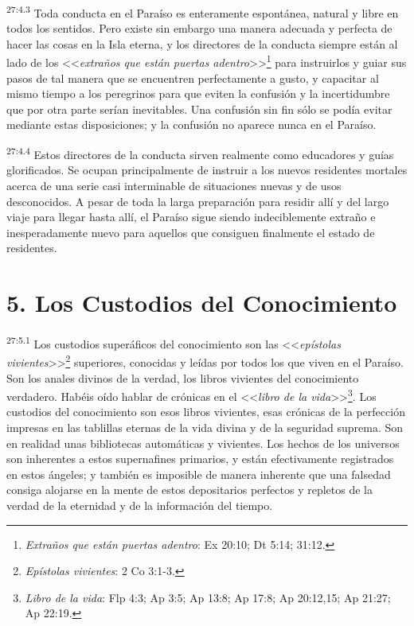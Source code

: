 \par
\textsuperscript{27:4.3} Toda conducta en el Paraíso es enteramente espontánea, natural y libre en todos los sentidos. Pero existe sin embargo una manera adecuada y perfecta de hacer las cosas en la Isla eterna, y los directores de la conducta siempre están al lado de los <<\textit{extraños que están puertas adentro}>>\footnote{\textit{Extraños que están puertas adentro}: Ex 20:10; Dt 5:14; 31:12.} para instruirlos y guiar sus pasos de tal manera que se encuentren perfectamente a gusto, y capacitar al mismo tiempo a los peregrinos para que eviten la confusión y la incertidumbre que por otra parte serían inevitables. Una confusión sin fin sólo se podía evitar mediante estas disposiciones; y la confusión no aparece nunca en el Paraíso.

\par
\textsuperscript{27:4.4} Estos directores de la conducta sirven realmente como educadores y guías glorificados. Se ocupan principalmente de instruir a los nuevos residentes mortales acerca de una serie casi interminable de situaciones nuevas y de usos desconocidos. A pesar de toda la larga preparación para residir allí y del largo viaje para llegar hasta allí, el Paraíso sigue siendo indeciblemente extraño e inesperadamente nuevo para aquellos que consiguen finalmente el estado de residentes.

\section*{5. Los Custodios del Conocimiento}
\par
\textsuperscript{27:5.1} Los custodios superáficos del conocimiento son las <<\textit{epístolas vivientes}>>\footnote{\textit{Epístolas vivientes}: 2 Co 3:1-3.} superiores, conocidas y leídas por todos los que viven en el Paraíso. Son los anales divinos de la verdad, los libros vivientes del conocimiento verdadero. Habéis oído hablar de crónicas en el <<\textit{libro de la vida}>>\footnote{\textit{Libro de la vida}: Flp 4:3; Ap 3:5; Ap 13:8; Ap 17:8; Ap 20:12,15; Ap 21:27; Ap 22:19.}. Los custodios del conocimiento son esos libros vivientes, esas crónicas de la perfección impresas en las tablillas eternas de la vida divina y de la seguridad suprema. Son en realidad unas bibliotecas automáticas y vivientes. Los hechos de los universos son inherentes a estos supernafines primarios, y están efectivamente registrados en estos ángeles; y también es imposible de manera inherente que una falsedad consiga alojarse en la mente de estos depositarios perfectos y repletos de la verdad de la eternidad y de la información del tiempo.

